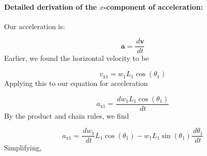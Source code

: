 \documentclass[12pt]{article}
\begin{document}
\paragraph{Detailed derivation of the $x$-component of acceleration:}
\label{GD:accelerationX1Deriv}
Our acceleration is:

\begin{displaymath}
\symbf{a}=\frac{\,d\symbf{v}}{\,dt}
\end{displaymath}
Earlier, we found the horizontal velocity to be

\begin{displaymath}
{v_{\text{x}1}}={w_{1}} {L_{1}} \cos\left({θ_{1}}\right)
\end{displaymath}
Applying this to our equation for acceleration

\begin{displaymath}
{a_{\text{x}1}}=\frac{\,d{w_{1}} {L_{1}} \cos\left({θ_{1}}\right)}{\,dt}
\end{displaymath}
By the product and chain rules, we find

\begin{displaymath}
{a_{\text{x}1}}=\frac{\,d{w_{1}}}{\,dt} {L_{1}} \cos\left({θ_{1}}\right)-{w_{1}} {L_{1}} \sin\left({θ_{1}}\right) \frac{\,d{θ_{1}}}{\,dt}
\end{displaymath}
Simplifying,
\end{document}
